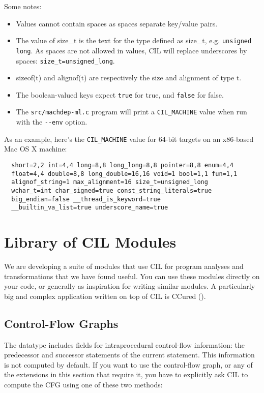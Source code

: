 \documentclass[letterpaper]{article}
\def\apiref#1#2#3{\ahref{api/#1.html\##2#3}{#1.#3}}
\def\ciltyperef#1{\apiref{Cil}{TYPE}{#1}}
\def\t#1{{\tt #1}}
\begin{document}
Some notes:
\begin{itemize}
\item Values cannot contain spaces as spaces separate key/value pairs. 
\item The value of size\_t is the text for the type defined as
  size\_t, e.g. \t{unsigned long}. As spaces are not allowed in values,
  CIL will replace underscores by spaces: \t{size\_t=unsigned\_long}.
\item sizeof(t) and alignof(t) are respectively the size and alignment of
  type t.
\item The boolean-valued keys expect \t{true} for true, and \t{false}
  for false.
\item The \t{src/machdep-ml.c} program will print a \t{CIL\_MACHINE} value
  when run with the \t{-{}-env} option.
\end{itemize}

As an example, here's the \t{CIL\_MACHINE} value for 64-bit targets on
an x86-based Mac OS X machine:
\begin{verbatim}
  short=2,2 int=4,4 long=8,8 long_long=8,8 pointer=8,8 enum=4,4
  float=4,4 double=8,8 long_double=16,16 void=1 bool=1,1 fun=1,1
  alignof_string=1 max_alignment=16 size_t=unsigned_long 
  wchar_t=int char_signed=true const_string_literals=true 
  big_endian=false __thread_is_keyword=true 
  __builtin_va_list=true underscore_name=true
\end{verbatim}


\section{Library of CIL Modules} \label{sec-Extension}

 We are developing a suite of modules that use CIL for program analyses and
transformations that we have found useful. You can use these modules directly
on your code, or generally as inspiration for writing similar modules. A
particularly big and complex application written on top of CIL is CCured
().

\subsection{Control-Flow Graphs} \label{sec-cfg}

The \ciltyperef{stmt} datatype includes fields for intraprocedural
control-flow information: the predecessor and successor statements of
the current statement.  This information is not computed by default.
If you want to use the control-flow graph, or any of the extensions in
this section that require it, you have to explicitly ask CIL to
compute the CFG using one of these two methods:
\end{document}
